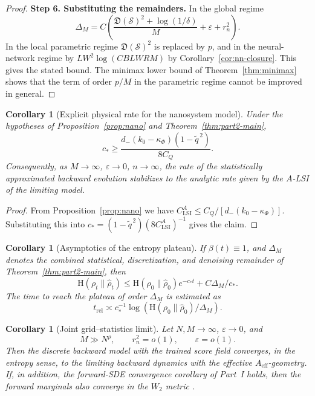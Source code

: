\documentclass{article}
\newtheorem{corollary}[theorem]{Corollary}
\newcommand{\Ent}{\mathrm H}
\begin{document}
\begin{proof}
\smallskip
\noindent\textbf{Step 6. Substituting the remainders.}
In the global regime
\[
        \Delta_M
        =C\left(
        \frac{\mathfrak D(\mathcal S)^2+\log(1/\delta)}{M}
        +\varepsilon+r_n^2\right).
\]
In the local parametric regime \(\mathfrak D(\mathcal S)^2\) is replaced by \(p\),
and in the neural-network regime by \(LW^2\log(CBLWRM)\) by
Corollary~\ref{cor:nn-closure}. This gives the stated bound. The minimax lower
bound of Theorem~\ref{thm:minimax} shows that the term of order \(p/M\) in the
parametric regime cannot be improved in general.
\end{proof}




\begin{corollary}[Explicit physical rate for the nanosystem model]
\label{cor:physical-rate}
Under the hypotheses of Proposition~\ref{prop:nano} and
Theorem~\ref{thm:part2-main},
\[
        c_*\ge
        \frac{d_-(k_0-\kappa_\Phi)(1-\widetilde q^{\,2})}{8C_Q}.
\]
Consequently, as \(M\to\infty\), \(\varepsilon\to0\), \(n\to\infty\), the rate of
the statistically approximated backward evolution stabilizes to the analytic rate
given by the \(A\)-LSI of the limiting model.
\end{corollary}

\begin{proof}
From Proposition~\ref{prop:nano} we have
\(C_{\mathrm{LSI}}^A\le C_Q/[d_-(k_0-\kappa_\Phi)]\). Substituting this into
\(c_*=(1-\widetilde q^{\,2})(8C_{\mathrm{LSI}}^A)^{-1}\) gives the claim.
\end{proof}

\begin{corollary}[Asymptotics of the entropy plateau]
\label{cor:entropy-plateau-asymptotics}
If \(\beta(t)\equiv1\), and \(\Delta_M\) denotes the combined statistical,
discretization, and denoising remainder of Theorem~\ref{thm:part2-main}, then
\[
        \Ent(\rho_t\|\hat\rho_t)
        \le
        \Ent(\rho_0\|\hat\rho_0)e^{-c_*t}+C\Delta_M/c_* .
\]
The time to reach the plateau of order \(\Delta_M\) is estimated as
\[
        t_{\mathrm{rel}}\asymp c_*^{-1}\log(\Ent(\rho_0\|\hat\rho_0)/\Delta_M).
\]
\end{corollary}

\begin{corollary}[Joint grid--statistics limit]
\label{cor:joint-limit}
Let \(N,M\to\infty\), \(\varepsilon\to0\), and
\[        M\gg N^{\rho},\qquad r_n^2=o(1),\qquad \varepsilon=o(1). \]
Then the discrete backward model with the trained score field converges, in the
entropy sense, to the limiting backward dynamics with the effective
\(A_{\mathrm{eff}}\)-geometry. If, in addition, the forward-SDE convergence
corollary of Part~I holds, then the forward marginals also converge in the \(W_2\)
metric \cite{Villani}.
\end{corollary}
\end{document}
